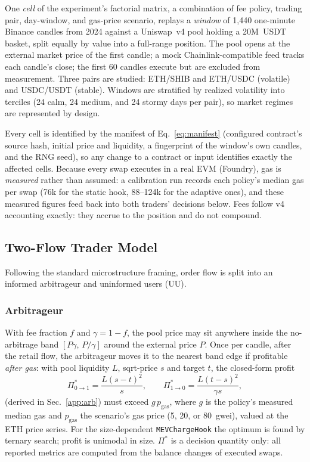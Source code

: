 \documentclass[a4paper,conference]{IEEEtran}
\begin{document}
One \emph{cell} of the experiment's factorial matrix, a
combination of fee policy, trading pair, day-window, and gas-price
scenario, replays a \emph{window} of 1{,}440 one-minute Binance
candles from 2024 against a Uniswap~v4 pool holding a 20M~USDT basket,
split equally by value into a full-range position. The pool opens at the external market price of the first
candle; a mock Chainlink-compatible feed tracks each candle's close; the
first 60 candles execute but are excluded from measurement. Three pairs
are studied: ETH/SHIB and ETH/USDC (volatile) and USDC/USDT (stable). Windows are stratified
by realized volatility into terciles (24 calm, 24 medium, and 24
stormy days per pair), so market regimes are represented by design.

Every cell is identified by the manifest of Eq.~\eqref{eq:manifest}
(configured contract's source hash, initial price and liquidity, a
fingerprint of the window's own candles, and the RNG seed), so any
change to a contract or input identifies exactly the affected cells.
Because every
swap executes in a real EVM (Foundry), gas is \emph{measured} rather
than assumed: a calibration run records each policy's median gas per
swap (76k for the static hook, 88--124k for the adaptive ones), and
these measured figures feed back into both traders' decisions below.
Fees follow v4 accounting exactly: they accrue to the position and do
not compound.

\subsection{Two-Flow Trader Model}

Following the standard microstructure framing, order flow is split into
an informed arbitrageur and uninformed users (UU).

\subsubsection{Arbitrageur}
With fee fraction $f$ and $\gamma=1-f$, the pool price may sit anywhere
inside the no-arbitrage band $[P\gamma,\,P/\gamma]$ around the external
price $P$. Once per candle, after the retail flow, the arbitrageur moves
it to the nearest band edge if profitable
\emph{after gas}: with pool liquidity $L$, sqrt-price $s$ and target
$t$, the closed-form profit
\begin{equation}
  \Pi^{*}_{0\to1}=\frac{L(s-t)^{2}}{s},\qquad
  \Pi^{*}_{1\to0}=\frac{L(t-s)^{2}}{\gamma s},
  \label{eq:arb-profit}
\end{equation}
(derived in Sec.~\ref{app:arb}) must exceed $g\,p_{\mathrm{gas}}$,
where $g$ is the policy's measured
median gas and $p_{\mathrm{gas}}$ the scenario's gas price (5, 20, or
80~gwei), valued at the ETH price series. For the size-dependent
\texttt{MEVChargeHook} the optimum is found by ternary search; profit is
unimodal in size. $\Pi^{*}$ is a decision quantity only: all reported
metrics are computed from the balance changes of executed swaps.
\end{document}
